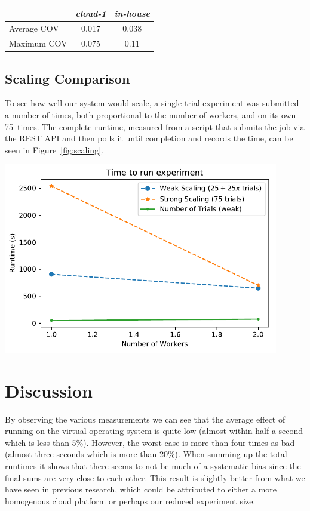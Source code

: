 \documentclass[a4paper]{IEEEtran}
\begin{document}
\begin{Figure}
  \centering
  \begin{tabular}{|l|c|c|}
    \hline
    & \emph{cloud-1} & \emph{in-house} \\
  \hline
  Average COV & 0.017 & 0.038 \\
  \hline
  Maximum COV  & 0.075 & 0.11 \\
  \hline
\end{tabular}
\label{tbl:complete2}
\end{Figure}


\subsection{Scaling Comparison}
To see how well our system would scale, a single-trial experiment was
submitted a number of times, both proportional to the number of
workers, and on its own 75~times. The complete runtime, measured from
a script that submits the job via the REST API and then polls it until
completion and records the time, can be seen in
Figure~\ref{fig:scaling}.
\begin{Figure}
  \centering \includegraphics[width=0.9\textwidth]{scaling_graph}
  \label{fig:scaling}
\end{Figure}

\section{Discussion}
By observing the various measurements we can see that the average
effect of running on the virtual operating system is quite low (almost
within half a second which is less than 5\%). However, the worst case
is more than four times as bad (almost three seconds which is more
than 20\%). When summing up the total runtimes it shows that there
seems to not be much of a systematic bias since the final sums are
very close to each other. This result is slightly better from what we
have seen in previous research, which could be attributed to either a
more homogenous cloud platform or perhaps our reduced experiment size.
\end{document}
